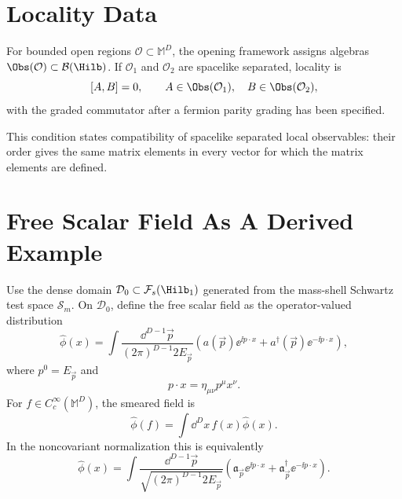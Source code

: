 \section{Locality Data}

\begin{definition}
\label{def:local-observable-assignment-chapter-two}
For bounded open regions \(\mathcal O\subset\mathbb M^D\), the opening
framework assigns algebras \(\Obs(\mathcal O)\subset\mathcal B(\Hilb)\). If
\(\mathcal O_1\) and \(\mathcal O_2\) are spacelike separated, locality is
\[
  [A,B]=0,
  \qquad
  A\in\Obs(\mathcal O_1),\quad B\in\Obs(\mathcal O_2),
\]
with the graded commutator after a fermion parity grading has been specified.

This condition states compatibility of spacelike separated local observables:
their order gives the same matrix elements in every vector for which the
matrix elements are defined.
\end{definition}

\section{Free Scalar Field As A Derived Example}

\begin{definition}
\label{def:free-scalar-field-mass-shell-kernels}
Use the dense domain \(\mathcal D_0\subset\mathcal F_s(\Hilb_1)\) generated
from the mass-shell Schwartz test space \(\mathcal S_m\).  On \(\mathcal D_0\),
define the free scalar field as the
operator-valued distribution
\[
  \widehat\phi(x)
  =
  \int
  \frac{\dd^{D-1}\vec p}{(2\pi)^{D-1}2E_{\vec p}}
  \left(
    a(\vec p)\ee^{\ii p\cdot x}
    +
    a^\dagger(\vec p)\ee^{-\ii p\cdot x}
  \right),
\]
where \(p^0=E_{\vec p}\) and
\[
  p\cdot x=\eta_{\mu\nu}p^\mu x^\nu.
\]
For \(f\in C_c^\infty(\mathbb M^D)\), the smeared field is
\[
  \widehat\phi(f)=\int\dd^Dx\,f(x)\widehat\phi(x).
\]
In the noncovariant normalization this is equivalently
\[
  \widehat\phi(x)
  =
  \int
  \frac{\dd^{D-1}\vec p}
       {\sqrt{(2\pi)^{D-1}2E_{\vec p}}}
  \left(
    \mathfrak a_{\vec p}\ee^{\ii p\cdot x}
    +
    \mathfrak a_{\vec p}^{\dagger}\ee^{-\ii p\cdot x}
  \right).
\]
\end{definition}


